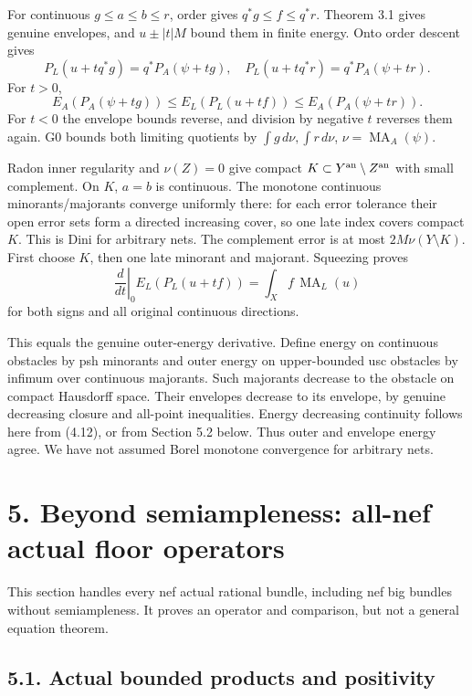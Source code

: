 \documentclass[
  10pt,
]{article}
\begin{document}
For continuous \(g\le a\le b\le r\), order gives \(q^*g\le f\le q^*r\).
Theorem 3.1 gives genuine envelopes, and \(u\pm|t|M\) bound them in
finite energy. Onto order descent gives
\[P_L(u+tq^*g)=q^*P_A(\psi+tg),\quad
P_L(u+tq^*r)=q^*P_A(\psi+tr).\] For \(t>0\),
\[E_A(P_A(\psi+tg))\le E_L(P_L(u+tf))
\le E_A(P_A(\psi+tr)). \tag{4.16}\] For \(t<0\) the envelope bounds
reverse, and division by negative \(t\) reverses them again. G0 bounds
both limiting quotients by \(\int g\,d\nu,\int r\,d\nu\),
\(\nu=\operatorname{MA}_A(\psi)\).

Radon inner regularity and \(\nu(Z)=0\) give compact
\(K\subset Y^{\rm an}\setminus Z^{\rm an}\) with small complement. On
\(K\), \(a=b\) is continuous. The monotone continuous
minorants/majorants converge uniformly there: for each error tolerance
their open error sets form a directed increasing cover, so one late
index covers compact \(K\). This is Dini for arbitrary nets. The
complement error is at most \(2M\nu(Y\setminus K)\). First choose \(K\),
then one late minorant and majorant. Squeezing proves
\[\left.\frac d{dt}\right|_0 E_L(P_L(u+tf))
=\int_X f\,\operatorname{MA}_L(u) \tag{4.17}\] for both signs and all
original continuous directions.

This equals the genuine outer-energy derivative. Define energy on
continuous obstacles by psh minorants and outer energy on upper-bounded
usc obstacles by infimum over continuous majorants. Such majorants
decrease to the obstacle on compact Hausdorff space. Their envelopes
decrease to its envelope, by genuine decreasing closure and all-point
inequalities. Energy decreasing continuity follows here from (4.12), or
from Section 5.2 below. Thus outer and envelope energy agree. We have
not assumed Borel monotone convergence for arbitrary nets.

\section{5. Beyond semiampleness: all-nef actual floor
operators}\label{beyond-semiampleness-all-nef-actual-floor-operators}

This section handles every nef actual rational bundle, including nef big
bundles without semiampleness. It proves an operator and comparison, but
not a general equation theorem.

\subsection{5.1. Actual bounded products and
positivity}\label{actual-bounded-products-and-positivity}
\end{document}
